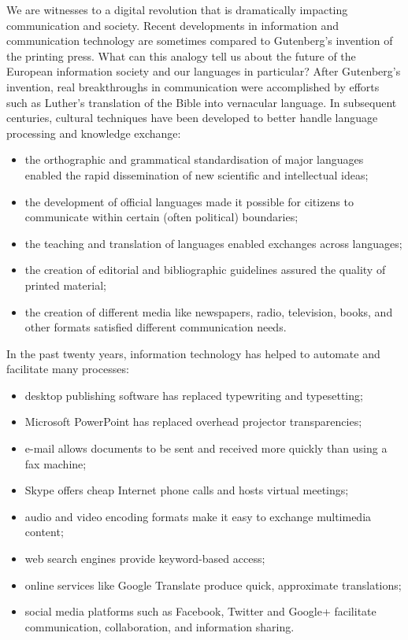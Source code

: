 \documentclass{../../metanetpaper}
\begin{document}
\begin{multicols}{2}

We are witnesses to a digital revolution that is dramatically impacting communication and society. Recent developments in information and communication technology are sometimes compared to Gutenberg’s invention of the printing press. What can this analogy tell us about the future of the European information society and our languages in particular?  After Gutenberg’s invention, real breakthroughs in communication were accomplished by efforts such as Luther’s translation of the Bible into vernacular language. In subsequent centuries, cultural techniques have been developed to better handle language processing and knowledge exchange:

\begin{itemize}
\item the orthographic and grammatical standardisation of major languages enabled the rapid dissemination of new scientific and intellectual ideas;
\item the development of official languages made it possible for citizens to communicate within certain (often political) boundaries;
\item the teaching and translation of languages enabled exchanges across languages;
\item the creation of editorial and bibliographic guidelines assured the quality of printed material;
\item the creation of different media like newspapers, radio, television, books, and other formats satisfied different communication needs. 
\end{itemize}

In the past twenty years, information technology has helped to automate and facilitate many processes:

\begin{itemize}
\item desktop publishing software has replaced typewriting and typesetting;
\item Microsoft PowerPoint has replaced overhead projector transparencies;
\item e-mail allows documents to be sent and received more quickly than using a fax machine;
\item Skype offers cheap Internet phone calls and hosts virtual meetings;
\item audio and video encoding formats make it easy to exchange multimedia content;
\item web search engines provide keyword-based access;
\item online services like Google Translate produce quick, approximate translations;
\item social media platforms such as Facebook, Twitter and Google+ facilitate communication, collaboration, and information sharing.
\end{itemize}


\end{multicols}
\end{document}
